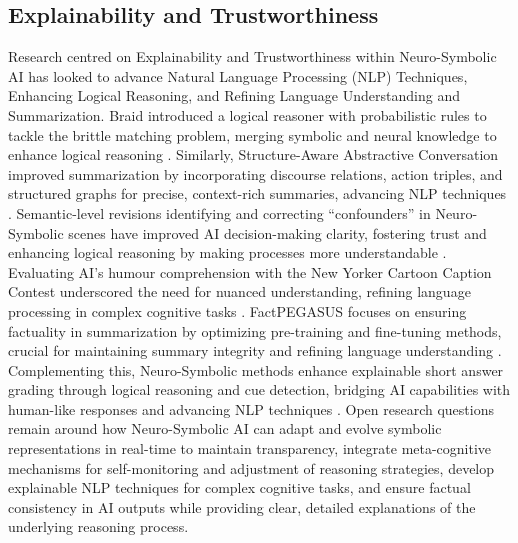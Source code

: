 \documentclass[hf]{ceurart}
\begin{document}
\subsection{Explainability and Trustworthiness}\label{subsec:disc_xai}
Research centred on Explainability and Trustworthiness within Neuro-Symbolic AI has looked to advance Natural Language Processing (NLP) Techniques, Enhancing Logical Reasoning, and Refining Language Understanding and Summarization. Braid introduced a logical reasoner with probabilistic rules to tackle the brittle matching problem, merging symbolic and neural knowledge to enhance logical reasoning \cite{Kalyanpur2020}. Similarly, Structure-Aware Abstractive Conversation improved summarization by incorporating discourse relations, action triples, and structured graphs for precise, context-rich summaries, advancing NLP techniques \cite{Chen2021}. Semantic-level revisions identifying and correcting \enquote{confounders} in Neuro-Symbolic scenes have improved AI decision-making clarity, fostering trust and enhancing logical reasoning by making processes more understandable \cite{Stammer2021}. Evaluating AI's humour comprehension with the New Yorker Cartoon Caption Contest underscored the need for nuanced understanding, refining language processing in complex cognitive tasks \cite{Hessel2022}. FactPEGASUS focuses on ensuring factuality in summarization by optimizing pre-training and fine-tuning methods, crucial for maintaining summary integrity and refining language understanding \cite{Huang2023}. Complementing this, Neuro-Symbolic methods enhance explainable short answer grading through logical reasoning and cue detection, bridging AI capabilities with human-like responses and advancing NLP techniques \cite{Kuennecke2024}. Open research questions remain around how Neuro-Symbolic AI can adapt and evolve symbolic representations in real-time to maintain transparency, integrate meta-cognitive mechanisms for self-monitoring and adjustment of reasoning strategies, develop explainable NLP techniques for complex cognitive tasks, and ensure factual consistency in AI outputs while providing clear, detailed explanations of the underlying reasoning process.
\end{document}
